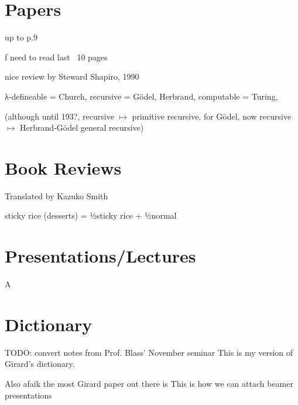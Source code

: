 \documentclass[
	fontsize=10pt, %
	twoside=false, %
	secnumdepth=-1, %
]{kaobook}
\begin{document}
\listoftables %

\endgroup


\mainmatter %

\chapter{Papers}
up to p.9

f
    need to read last ~10 pages

    nice review by Steward Shapiro, 1990

    λ-defineable = Church,
    recursive = Gödel, Herbrand,
    computable = Turing,

    (although until 193?, recursive $↦$ primitive recursive, for Gödel,
    now recursive $↦$ Herbrand-Gödel general recursive)
\chapter{Book Reviews}
    Translated by Kazuko Smith

    sticky rice (desserts) = ½sticky rice + ½normal
\chapter{Presentations/Lectures}
    A
\chapter{Dictionary}
    TODO: convert notes from Prof. Blass' November seminar
    This is my version of Girard's dictionary.

    Also afaik the most Girard paper out there is
    This is how we can attach beamer presentations
\end{document}
